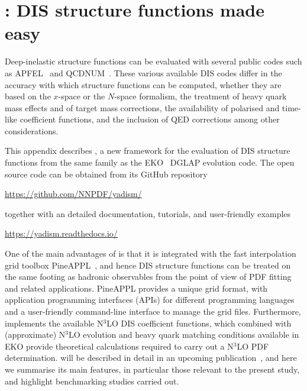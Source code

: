 
\section{\yadism: DIS structure functions made easy}
\label{app/dis:yadism}

Deep-inelastic structure functions can be evaluated with several
public codes such as {\sc\small APFEL}~\cite{Bertone:2013vaa} and
{\sc\small QCDNUM}~\cite{Botje:2010ay}.
%
These various available DIS codes differ in the accuracy with which structure functions can be computed,
whether they are based on the $x$-space or the $N$-space formalism,
the treatment of heavy quark mass effects and of target mass corrections, the availability
of polarised and time-like coefficient functions, and
the inclusion of QED corrections among  other considerations.

This appendix describes \yadism, a new framework
for the evaluation of DIS structure functions from the same family
as the {\sc\small EKO}~\cite{Candido:2022tld} DGLAP evolution code.
%
The open source \yadism code can be obtained from its GitHub repository
\begin{center}
  \url{https://github.com/NNPDF/yadism/}
  \end{center}  
together with an detailed documentation, tutorials, and user-friendly examples
\begin{center}
\url{https://yadism.readthedocs.io/}
\end{center}  
One of the main advantages of \yadism is that it is integrated
with the fast interpolation grid toolbox {\sc\small PineAPPL}~\cite{Carrazza:2020gss},
and hence DIS structure functions can be treated on the same footing as hadronic observables
from the point of view of PDF fitting and related applications.
%
{\sc\small PineAPPL} provides a unique grid format, with application programming interfaces (APIs)
for different programming languages
and a user-friendly command-line interface to manage the grid files.
%
Furthermore, \yadism implements the available N$^3$LO DIS coefficient functions,
which combined with (approximate)  N$^3$LO evolution
and heavy quark matching conditions available in {\sc\small EKO} provide
theoretical calculations required to carry out a N$^3$LO PDF determination.
%
\yadism will be described in detail in an upcoming publication~\cite{yadism},
and here we summarise its main features, in particular those
relevant to the present study, and highlight benchmarking
studies carried out.

